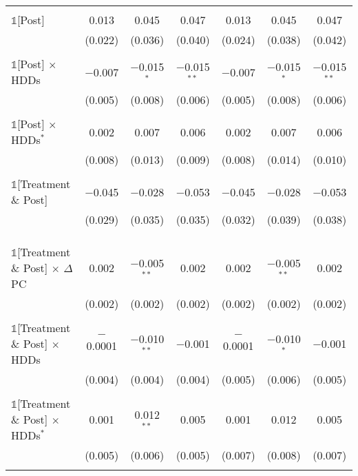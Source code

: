\begin{ThreePartTable}
\begin{longtable}{@{\extracolsep{0pt}}lcccccc}
            & & & & & & \\ 
            $\mathbb{1}$[Post] & 0.013 & 0.045 & 0.047 & 0.013 & 0.045 & 0.047 \\ 
            & (0.022) & (0.036) & (0.040) & (0.024) & (0.038) & (0.042) \\ 
            & & & & & & \\ 
            $\mathbb{1}$[Post] $\times$ HDDs & $-$0.007 & $-$0.015$^{*}$ & $-$0.015$^{**}$ & $-$0.007 & $-$0.015$^{*}$ & $-$0.015$^{**}$ \\ 
            & (0.005) & (0.008) & (0.006) & (0.005) & (0.008) & (0.006) \\ 
            & & & & & & \\ 
            $\mathbb{1}$[Post] $\times$ HDDs$^{*}$ & 0.002 & 0.007 & 0.006 & 0.002 & 0.007 & 0.006 \\ 
            & (0.008) & (0.013) & (0.009) & (0.008) & (0.014) & (0.010) \\ 
            & & & & & & \\ 
            $\mathbb{1}$[Treatment \& Post] & $-$0.045 & $-$0.028 & $-$0.053 & $-$0.045 & $-$0.028 & $-$0.053 \\ 
            & (0.029) & (0.035) & (0.035) & (0.032) & (0.039) & (0.038) \\ 
            & & & & & & \\ 
            & & & & & & \\ 
            & & & & & & \\ 
            $\mathbb{1}$[Treatment \& Post] $\times$ $\Delta$PC & 0.002 & $-$0.005$^{**}$ & 0.002 & 0.002 & $-$0.005$^{**}$ & 0.002 \\ 
            & (0.002) & (0.002) & (0.002) & (0.002) & (0.002) & (0.002) \\ 
            & & & & & & \\ 
            $\mathbb{1}$[Treatment \& Post] $\times$ HDDs & $-$0.0001 & $-$0.010$^{**}$ & $-$0.001 & $-$0.0001 & $-$0.010$^{*}$ & $-$0.001 \\ 
            & (0.004) & (0.004) & (0.004) & (0.005) & (0.006) & (0.005) \\ 
            & & & & & & \\ 
            $\mathbb{1}$[Treatment \& Post] $\times$ HDDs$^{*}$ & 0.001 & 0.012$^{**}$ & 0.005 & 0.001 & 0.012 & 0.005 \\ 
            & (0.005) & (0.006) & (0.005) & (0.007) & (0.008) & (0.007) \\ 
            & & & & & & \\ 

\end{longtable}
\end{ThreePartTable}
